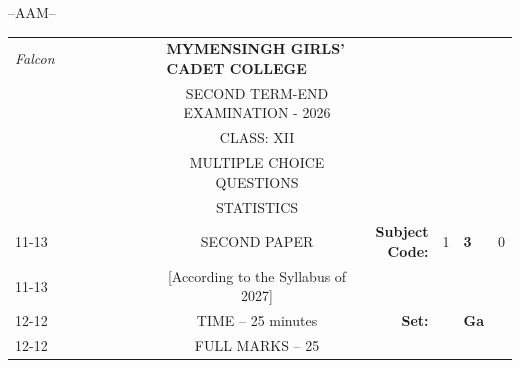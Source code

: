 \documentclass[12pt]{exam}
\begin{document}
\vspace{1cm}
\begin{center}
\vfill 
--AAM--
\end{center}

\newpage


\begin{table}[]
\begin{tabular}{llllllllcllll}
\textit{Falcon} &  &  &  &  &  &  &  & \multicolumn{1}{l}{\textbf{MYMENSINGH GIRLS' CADET COLLEGE}} &                                             &                        &                                 &                        \\
                &  &  &  &  &  &  &  & \multicolumn{1}{c}{SECOND TERM-END EXAMINATION - 2026}       &                                             &                        & \multicolumn{1}{c}{}            &                        \\
                &  &  &  &  &  &  &  & CLASS: XII                                                   &                                             &                        & \multicolumn{1}{c}{}            &                        \\
                &  &  &  &  &  &  &  & MULTIPLE CHOICE QUESTIONS                                    &                                             &                        & \multicolumn{1}{c}{}            &                        \\
                &  &  &  &  &  &  &  & STATISTICS                                                   &                                             &                        & \multicolumn{1}{r}{}            &                        \\ \cline{11-13} 
                &  &  &  &  &  &  &  & SECOND PAPER                                                 & \multicolumn{1}{r|}{\textbf{Subject Code:}} & \multicolumn{1}{l|}{1} & \multicolumn{1}{l|}{\textbf{3}} & \multicolumn{1}{l|}{0} \\ \cline{11-13} 
                &  &  &  &  &  &  &  & [According to the Syllabus of 2027]                          & \multicolumn{1}{r}{}                        &                        &                                 &                        \\ \cline{12-12}
                &  &  &  &  &  &  &  & TIME – 25 minutes                                            & \multicolumn{1}{r}{\textbf{Set:}}           & \multicolumn{1}{l|}{}  & \multicolumn{1}{l|}{\textbf{Ga}} &                        \\ \cline{12-12}
                &  &  &  &  &  &  &  & FULL MARKS – 25                                              &                                             &                        &                                 &                       
\end{tabular}
\end{table}
\end{document}

